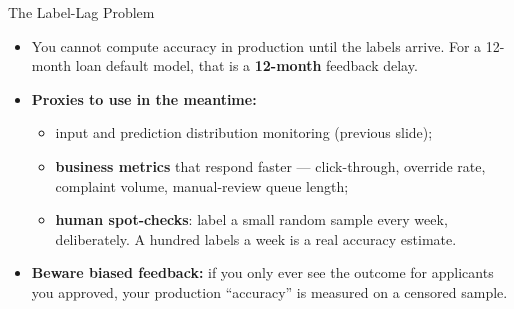 
\begin{frame}{The Label-Lag Problem}

    \centering

    \vspace{1.0em}
    \begin{itemize}
        \item You cannot compute accuracy in production until the labels arrive. For a 12-month loan default
              model, that is a \textbf{12-month} feedback delay.
        \item \textbf{Proxies to use in the meantime:}
              \begin{itemize}
                  \item input and prediction distribution monitoring (previous slide);
                  \item \textbf{business metrics} that respond faster --- click-through, override rate,
                        complaint volume, manual-review queue length;
                  \item \textbf{human spot-checks}: label a small random sample every week, deliberately.
                        A hundred labels a week is a real accuracy estimate.
              \end{itemize}
        \item \textbf{Beware biased feedback:} if you only ever see the outcome for applicants you approved,
              your production ``accuracy'' is measured on a censored sample.
    \end{itemize}

\end{frame}
